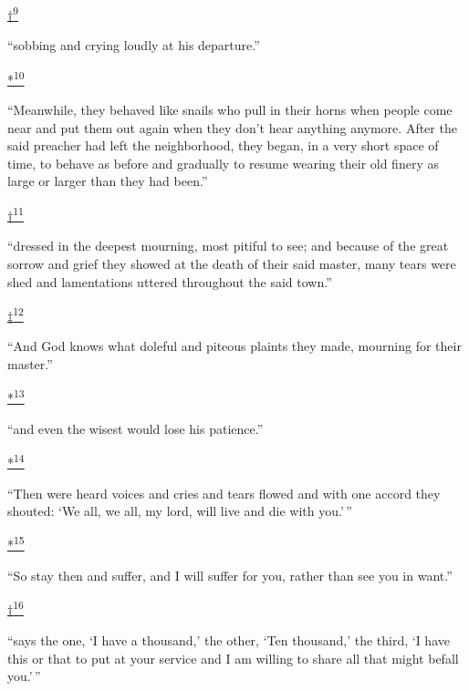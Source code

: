 \protect\hypertarget{23_NOTES.xhtmlux5cux23id_2264}{\protect\hyperlink{08_Chapter_One__THE_PASSIONATE_INTE.xhtmlux5cux23id_2262}{†\textsuperscript{9}}}
``sobbing and crying loudly at his departure.''

\protect\hypertarget{23_NOTES.xhtmlux5cux23id_2266}{\protect\hyperlink{08_Chapter_One__THE_PASSIONATE_INTE.xhtmlux5cux23id_2267}{*\textsuperscript{10}}}
``Meanwhile, they behaved like snails who pull in their horns when
people come near and put them out again when they don't hear anything
anymore. After the said preacher had left the neighborhood, they began,
in a very short space of time, to behave as before and gradually to
resume wearing their old finery as large or larger than they had been.''

\protect\hypertarget{23_NOTES.xhtmlux5cux23id_2268}{\protect\hyperlink{08_Chapter_One__THE_PASSIONATE_INTE.xhtmlux5cux23id_2269}{†\textsuperscript{11}}}
``dressed in the deepest mourning, most pitiful to see; and because of
the great sorrow and grief they showed at the death of their said
master, many tears were shed and lamentations uttered throughout the
said town.''

\protect\hypertarget{23_NOTES.xhtmlux5cux23id_2274}{\protect\hyperlink{08_Chapter_One__THE_PASSIONATE_INTE.xhtmlux5cux23id_2271}{‡\textsuperscript{12}}}
``And God knows what doleful and piteous plaints they made, mourning for
their master.''

\protect\hypertarget{23_NOTES.xhtmlux5cux23id_2306}{\protect\hyperlink{08_Chapter_One__THE_PASSIONATE_INTE.xhtmlux5cux23id_2305}{*\textsuperscript{13}}}
``and even the wisest would lose his patience.''

\protect\hypertarget{23_NOTES.xhtmlux5cux23id_2272}{\protect\hyperlink{08_Chapter_One__THE_PASSIONATE_INTE.xhtmlux5cux23id_2273}{*\textsuperscript{14}}}
``Then were heard voices and cries and tears flowed and with one accord
they shouted: `We all, we all, my lord, will live and die with you.'\,''

\protect\hypertarget{23_NOTES.xhtmlux5cux23id_2276}{\protect\hyperlink{08_Chapter_One__THE_PASSIONATE_INTE.xhtmlux5cux23id_2277}{*\textsuperscript{15}}}
``So stay then and suffer, and I will suffer for you, rather than see
you in want.''

\protect\hypertarget{23_NOTES.xhtmlux5cux23id_2280}{\protect\hyperlink{08_Chapter_One__THE_PASSIONATE_INTE.xhtmlux5cux23id_2275}{†\textsuperscript{16}}}
``says the one, `I have a thousand,' the other, `Ten thousand,' the
third, `I have this or that to put at your service and I am willing to
share all that might befall you.'\,''

